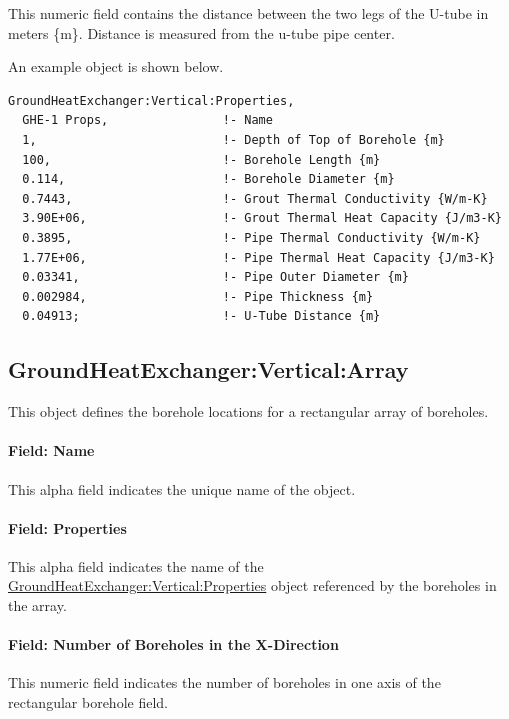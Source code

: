 This numeric field contains the distance between the two legs of the U-tube in meters \{m\}. Distance is measured from the u-tube pipe center.

An example object is shown below.

\begin{lstlisting}
GroundHeatExchanger:Vertical:Properties,
  GHE-1 Props,                !- Name
  1,                          !- Depth of Top of Borehole {m}
  100,                        !- Borehole Length {m}
  0.114,                      !- Borehole Diameter {m}
  0.7443,                     !- Grout Thermal Conductivity {W/m-K}
  3.90E+06,                   !- Grout Thermal Heat Capacity {J/m3-K}
  0.3895,                     !- Pipe Thermal Conductivity {W/m-K}
  1.77E+06,                   !- Pipe Thermal Heat Capacity {J/m3-K}
  0.03341,                    !- Pipe Outer Diameter {m}
  0.002984,                   !- Pipe Thickness {m}
  0.04913;                    !- U-Tube Distance {m}
\end{lstlisting}

\subsection{GroundHeatExchanger:Vertical:Array}\label{groundheatexchangerverticalarray}

This object defines the borehole locations for a rectangular array of boreholes.

\paragraph{Field: Name}

This alpha field indicates the unique name of the object.

\paragraph{Field: Properties}

This alpha field indicates the name of the \hyperref[groundheatexchangerverticalproperties]{GroundHeatExchanger:Vertical:Properties} object referenced by the boreholes in the array.

\paragraph{Field: Number of Boreholes in the X-Direction}

This numeric field indicates the number of boreholes in one axis of the rectangular borehole field.


